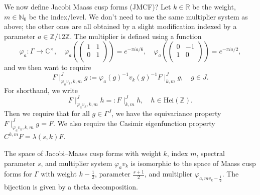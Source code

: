 \documentclass[reqno]{amsart} 
\numberwithin{theorem}{section}
\numberwithin{equation}{section}
\begin{document}
We now define Jacobi Maass cusp forms (JMCF)?  Let $k \in \mathbb{R}$ be the weight, $m \in \mathbb{N}_{0}$ be the index/level.  We don't need to use the same multiplier system as above; the other ones are all obtained by a slight modification indexed by a parameter $a \in \mathbb{Z} / 12 \mathbb{Z}$.  The multiplier is defined using a function
\begin{equation*}
  \varphi_a : \Gamma \rightarrow \mathbb{C}^\times , \quad \varphi_a \left(
    \begin{pmatrix}
      1      & 1 \\
      0 & 1 \\
    \end{pmatrix} \right) = e^{- \pi i a / 6},
  \quad
  \varphi_a \left(
    \begin{pmatrix}
      0      & -1 \\
      1 & 0 \\
    \end{pmatrix} \right)
  = e^{- \pi i a / 2},
\end{equation*}
and we then want to require
\begin{equation*}
  F \mid_{\varphi_a v_k, k, m}^J g := \varphi_a(g)^{-1} v_k(g)^{-1} F \mid_{k, m}^J g, \quad g \in J.
\end{equation*}
For shorthand, we write
\begin{equation*}
  F \mid_{\varphi_a v_k, k, m}^J h =: F \mid_{k, m}^J h, \quad h \in \mathrm{Hei}(\mathbb{Z}).
\end{equation*}
Then we require that for all $g \in \Gamma^J$, we have the equivariance property $F \mid_{\varphi_a v_k, k, m}^J g = F$.  We also require the Casimir eigenfunction property $C^{k, m} F = \lambda(s, k) F$.

\begin{theorem}[BCP]
  The space of Jacobi--Maass cusp forms with weight $k$, index $m$, spectral parameter $s$, and multiplier system $\varphi_a v_k$ is isomorphic to the space of Maass cusp forms for $\Gamma$ with weight $k - \tfrac{1}{2}$, parameter $\tfrac{s + 1}{2}$, and multiplier $\varphi_{a, m v_k - \tfrac{1}{2}}$.  The bijection is given by a theta decomposition.
\end{theorem}
\end{document}
